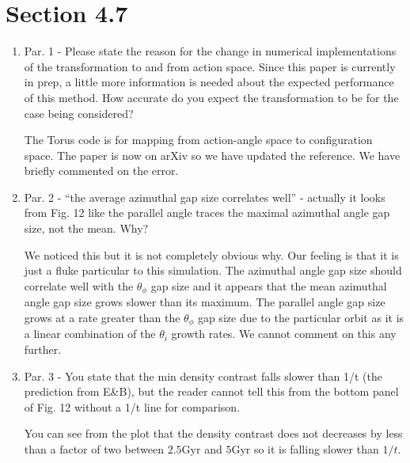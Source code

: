 \documentclass{article}
\begin{document}
\section{Section 4.7}
\begin{enumerate}
\item Par. 1 - Please state the reason for the change in numerical implementations of the
transformation to and from action space. Since this paper is currently in prep, a little
more information is needed about the expected performance of this method. How
accurate do you expect the transformation to be for the case being considered?

{\color{red} The Torus code is for mapping from action-angle space to configuration space. The paper is now on arXiv so we have updated the reference. We have briefly commented on the error.}


\item Par. 2 - “the average azimuthal gap size correlates well” - actually it looks from Fig. 12
like the parallel angle traces the maximal azimuthal angle gap size, not the mean. Why?

{\color{red} We noticed this but it is not completely obvious why. Our feeling is that it is just a fluke particular to this simulation. The azimuthal angle gap size should correlate well with the $\theta_\phi$ gap size and it appears that the mean azimuthal angle gap size grows slower than its maximum. The parallel angle gap size grows at a rate greater than the $\theta_\phi$ gap size due to the particular orbit as it is a linear combination of the $\theta_i$ growth rates. We cannot comment on this any further.}


\item Par. 3 - You state that the min density contrast falls slower than 1/t (the prediction from
E\&B), but the reader cannot tell this from the bottom panel of Fig. 12 without a 1/t line
for comparison.

{\color{red} You can see from the plot that the density contrast does not decreases by less than a factor of two between $2.5\mathrm{Gyr}$ and $5\mathrm{Gyr}$ so it is falling slower than $1/t$.}

\end{enumerate}
\end{document}
